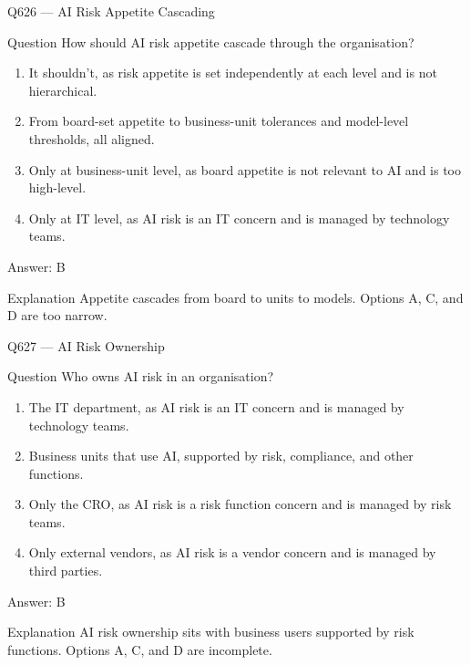 \documentclass[aspectratio=169,8pt]{beamer}
\begin{document}
	\begin{frame}{Q626 --- AI Risk Appetite Cascading}
		\begin{block}{Question}
			How should AI risk appetite cascade through the organisation?
			\begin{enumerate}
				\item It shouldn't, as risk appetite is set independently at each level and is not hierarchical.
				\item From board-set appetite to business-unit tolerances and model-level thresholds, all aligned.
				\item Only at business-unit level, as board appetite is not relevant to AI and is too high-level.
				\item Only at IT level, as AI risk is an IT concern and is managed by technology teams.
			\end{enumerate}
		\end{block}
		\begin{exampleblock}{Answer: B}\end{exampleblock}
		\begin{block}{Explanation}
			Appetite cascades from board to units to models. Options A, C, and D are too narrow.
		\end{block}
	\end{frame}
	
	\begin{frame}{Q627 --- AI Risk Ownership}
		\begin{block}{Question}
			Who owns AI risk in an organisation?
			\begin{enumerate}
				\item The IT department, as AI risk is an IT concern and is managed by technology teams.
				\item Business units that use AI, supported by risk, compliance, and other functions.
				\item Only the CRO, as AI risk is a risk function concern and is managed by risk teams.
				\item Only external vendors, as AI risk is a vendor concern and is managed by third parties.
			\end{enumerate}
		\end{block}
		\begin{exampleblock}{Answer: B}\end{exampleblock}
		\begin{block}{Explanation}
			AI risk ownership sits with business users supported by risk functions. Options A, C, and D are incomplete.
		\end{block}
	\end{frame}
	
\end{document}

